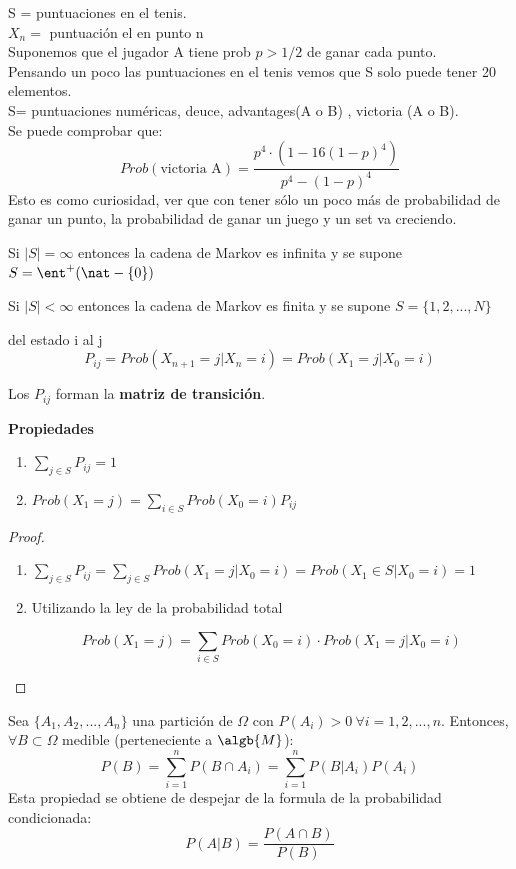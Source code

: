 \begin{example}[2]
	S = puntuaciones en el tenis.\\
	$X_n =$ puntuación el en punto n\\
	Suponemos que el jugador A tiene prob $p > 1/2$ de ganar cada punto.\\
	Pensando un poco las puntuaciones en el tenis vemos que S solo puede tener 20 elementos.\\
	S= puntuaciones numéricas, deuce, advantages(A o B) , victoria (A o B).\\
	Se puede comprobar que:
	$$Prob(\text{victoria A}) = \frac{p^4 \cdot(1- 16(1-p)^4)}{p^4 - (1-p)^4}$$
	Esto es como curiosidad, ver que con tener sólo un poco más de probabilidad de ganar un punto, la probabilidad de ganar un juego y un set va creciendo.
\end{example}




Si $|S| = \infty$ entonces la cadena de Markov es infinita y se supone $S = \ent^+ (\nat -\{0\})$


Si $|S| < \infty$ entonces la cadena de Markov es finita y se supone $S =\{1,2,...,N\}$

\begin{defn}
	del estado i al j
	$$P_{ij} = Prob(X_{n+1} = j| X_n = i) = Prob (X_1 = j| X_0 = i)$$
\end{defn}

Los $P_{ij}$ forman la \textbf{matriz de transición}.

\textbf{Propiedades}
\begin{enumerate}
	\item $\sum_{j \in S} P_{ij} = 1$
	\item $Prob(X_1 = j)= \sum_{i \in S} Prob(X_0 = i)P_{ij}$\\
\end{enumerate}

\begin{proof}
	\begin{enumerate}
		\item $\sum_{j \in S} P_{ij} = \sum_{j\in S} Prob(X_1 = j | X_0 = i) = Prob (X_1 \in S | X_0 = i) = 1$
		\item Utilizando la ley de la probabilidad total

		$$Prob(X_1 = j) = \sum_{i \in S} Prob (X_0 = i) \cdot Prob(X_1 = j| X_0 = i)$$
	\end{enumerate}
\end{proof}

	\begin{defn}
		Sea  $\{A_1, A_2,...,A_n\}$ una partición de $\Omega$ con $P(A_i)>0 \ \forall i=1,2,...,n$. Entonces, $\forall B \subset \Omega$ medible (perteneciente a $\algb{M}$):
		\[
		P(B)=\sum_{i=1}^{n}P(B\cap A_i)=\sum_{i=1}^{n}P(B|A_i)P(A_i)
		\]
		Esta propiedad se obtiene de despejar de la formula de la probabilidad condicionada:
		\[P(A|B)=\frac{P(A \cap B)}{P(B)}\]
	\end{defn}

